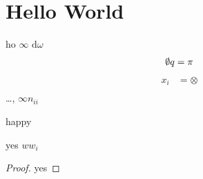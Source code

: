 \documentclass[12pt,class=article,crop=false]{standalone}
\begin{document}
\section{Hello World}
ho $ \infty \text{ d} \omega$ 
\begin{align*}
	\emptyset q=\pi
\end{align*}
\begin{align*}
	x_i&= \otimes    \\ 
\end{align*} 	
\ldots, $ \infty n_{ii}$
\begin{lem}
happy
\end{lem}
\begin{problem}[3.1]

\end{problem}
\begin{thm}
yes $ ww_i$
\end{thm}
\begin{proof}
yes
\end{proof}
\end{document}
